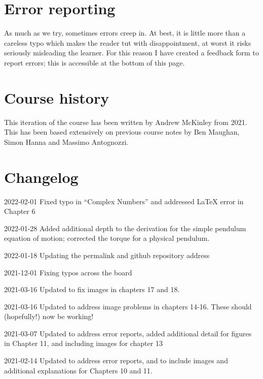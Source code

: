 \documentclass[
]{book}
\begin{document}
\hypertarget{error-reporting}{%
\section*{Error reporting}\label{error-reporting}}

As much as we try, sometimes errors creep in. At best, it is little more than a careless typo which makes the reader tut with disappointment, at worst it risks seriously misleading the learner. For this reason I have created a feedback form to report errors; this is accessible at the bottom of this page.

\hypertarget{course-history}{%
\section*{Course history}\label{course-history}}

This iteration of the course has been written by Andrew McKinley from 2021. This has been based extensively on previous course notes by Ben Maughan, Simon Hanna and Massimo Antognozzi.

\hypertarget{sec:changelog}{%
\section*{Changelog}\label{sec:changelog}}

2022-02-01 Fixed typo in ``Complex Numbers'' and addressed LaTeX error in Chapter 6

2022-01-28 Added additional depth to the derivation for the simple pendulum equation of motion; corrected the torque for a physical pendulum.

2022-01-18 Updating the permalink and github repository address

2021-12-01 Fixing typos across the board

2021-03-16 Updated to fix images in chapters 17 and 18.

2021-03-16 Updated to address image problems in chapters 14-16. These should (hopefully!) now be working!

2021-03-07 Updated to address error reports, added additional detail for figures in Chapter 11, and including images for chapter 13

2021-02-14 Updated to address error reports, and to include images and additional explanations for Chapters 10 and 11.
\end{document}
